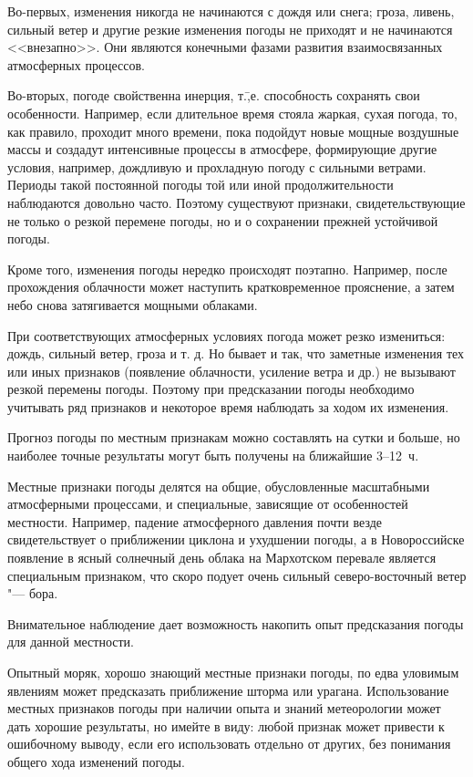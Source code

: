 Во-первых, изменения никогда не начинаются с дождя или снега; гроза,
ливень, сильный ветер и другие резкие изменения погоды не приходят и
не начинаются <<внезапно>>. Они являются конечными фазами развития
взаимосвязанных атмосферных процессов.

Во-вторых, погоде свойственна инерция, т.\=,е. способность сохранять
свои особенности. Например, если длительное время стояла жаркая, сухая
погода, то, как правило, проходит много времени, пока подойдут новые
мощные воздушные массы и создадут интенсивные процессы в атмосфере,
формирующие другие условия, например, дождливую и прохладную погоду с
сильными ветрами. Периоды такой постоянной погоды той или иной
продолжительности наблюдаются довольно часто. Поэтому существуют
признаки, свидетельствующие не только о резкой перемене погоды, но и о
сохранении прежней устойчивой погоды.

Кроме того, изменения погоды нередко происходят поэтапно. Например,
после прохождения облачности может наступить кратковременное
прояснение, а затем небо снова затягивается мощными облаками.

При соответствующих атмосферных условиях погода может резко
измениться: дождь, сильный ветер, гроза и т. д. Но бывает и так, что
заметные изменения тех или иных признаков (появление облачности,
усиление ветра и др.) не вызывают резкой перемены погоды. Поэтому при
предсказании погоды необходимо учитывать ряд признаков и некоторое
время наблюдать за ходом их изменения.

Прогноз погоды по местным признакам можно составлять на сутки и
больше, но наиболее точные результаты могут быть получены на ближайшие
3--12~ч.

Местные признаки погоды делятся на общие, обусловленные масштабными
атмосферными процессами, и специальные, зависящие от особенностей
местности. Например, падение атмосферного давления почти везде
свидетельствует о приближении циклона и ухудшении погоды, а в
Новороссийске появление в ясный солнечный день облака на Мархотском
перевале является специальным признаком, что скоро подует очень
сильный северо-восточный ветер "--- бора.

Внимательное наблюдение дает возможность накопить опыт предсказания
погоды для данной местности.

Опытный моряк, хорошо знающий местные признаки погоды, по едва
уловимым явлениям может предсказать приближение шторма или
урагана. Использование местных признаков погоды при наличии опыта и
знаний метеорологии может дать хорошие результаты, но имейте в виду:
любой признак может привести к ошибочному выводу, если его
использовать отдельно от других, без понимания общего хода изменений
погоды.

